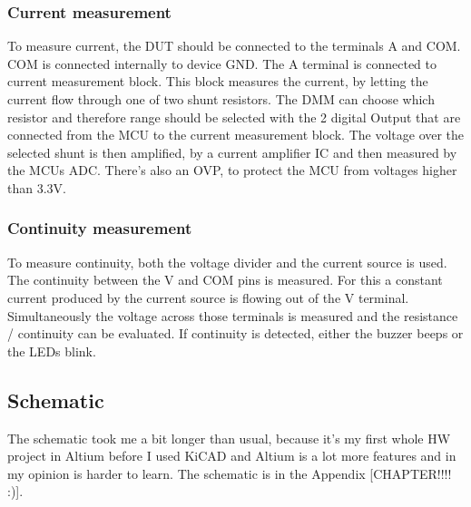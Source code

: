 \subsubsection{Current measurement}
To measure current, the DUT should be connected to the terminals A and COM. COM is connected internally to device GND. The A terminal is connected to current measurement block. This block measures the current, by letting the current flow through one of two shunt resistors. The DMM can choose which resistor and therefore range should be selected with the 2 digital Output that are connected from the MCU to the current measurement block. The voltage over the selected shunt is then amplified, by a current amplifier IC and then measured by the MCUs ADC. There's also an OVP, to protect the MCU from voltages higher than 3.3V. \cite{DMM_Video_ElectroNoobs}

\subsubsection{Continuity measurement}
To measure continuity, both the voltage divider and the current source is used. The continuity between the V and COM pins is measured. For this a constant current produced by the current source is flowing out of the V terminal. Simultaneously the voltage across those terminals is measured and the resistance / continuity can be evaluated. If continuity is detected, either the buzzer beeps or the LEDs blink. \cite{DMM_Video_ElectroNoobs}



\subsection{Schematic}
The schematic took me a bit longer than usual, because it's my first whole HW project in Altium before I used KiCAD and Altium is a lot more features and in my opinion is harder to learn. The schematic is in the Appendix [CHAPTER!!!! :)].